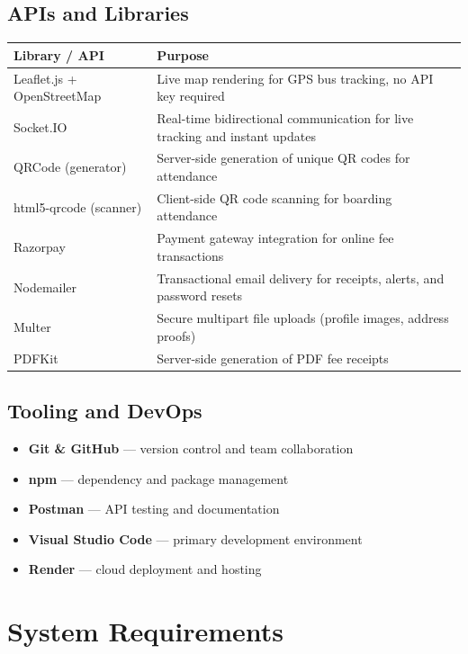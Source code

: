 \documentclass[11pt,a4paper]{report}
\begin{document}
\section{APIs and Libraries}
\begin{longtable}{@{}p{4cm}p{9.5cm}@{}}
\toprule
\rowcolor{pine!10}\textbf{Library / API} & \textbf{Purpose} \\
\midrule
\endhead
Leaflet.js + OpenStreetMap & Live map rendering for GPS bus tracking, no API key required \\
Socket.IO & Real-time bidirectional communication for live tracking and instant updates \\
QRCode (generator) & Server-side generation of unique QR codes for attendance \\
html5-qrcode (scanner) & Client-side QR code scanning for boarding attendance \\
Razorpay & Payment gateway integration for online fee transactions \\
Nodemailer & Transactional email delivery for receipts, alerts, and password resets \\
Multer & Secure multipart file uploads (profile images, address proofs) \\
PDFKit & Server-side generation of PDF fee receipts \\
\bottomrule
\end{longtable}

\section{Tooling and DevOps}
\begin{itemize}[leftmargin=1.3em]
  \item \textbf{Git \& GitHub} --- version control and team collaboration
  \item \textbf{npm} --- dependency and package management
  \item \textbf{Postman} --- API testing and documentation
  \item \textbf{Visual Studio Code} --- primary development environment
  \item \textbf{Render} --- cloud deployment and hosting
\end{itemize}

\chapter{System Requirements}
\end{document}
